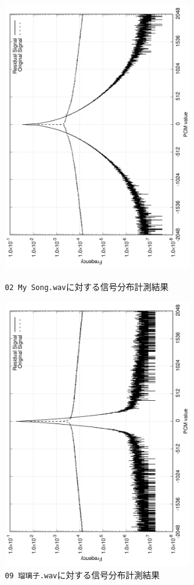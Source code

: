 \documentclass[uplatex,dvipdfmx,b5j,10pt]{jsbook}
\theoremstyle{definition}
\begin{document}
\begin{figure}[htbp]
  \begin{center}
    \includegraphics[width=80mm,angle=-90]{./figs/mysong_dist.png}
    \caption{\texttt{02 My Song.wav}に対する信号分布計測結果} \label{mysong_dist}
  \end{center}
  \begin{center}
    \includegraphics[width=80mm,angle=-90]{./figs/ruriko_dist.png}
    \caption{\texttt{09 瑠璃子.wav}に対する信号分布計測結果} \label{ruriko_dist}
  \end{center}
\end{figure}
\end{document}
